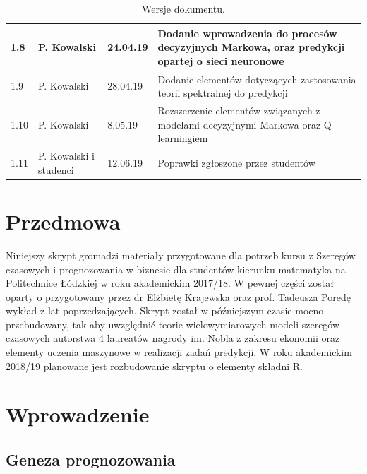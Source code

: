 \documentclass[10pt,a4paper]{book}
\begin{document}
\begin{table}[h]
\begin{tabular}{|p{1cm}|p{2cm}|p{12mm}|p{12cm}|}
1.8 & P. Kowalski & 24.04.19 & Dodanie wprowadzenia do procesów decyzyjnych Markowa, oraz predykcji opartej o sieci neuronowe \\\hline
1.9 & P. Kowalski & 28.04.19 & Dodanie elementów dotyczących zastosowania teorii spektralnej do predykcji \\\hline
1.10 & P. Kowalski & 8.05.19 & Rozszerzenie elementów związanych z modelami decyzyjnymi Markowa oraz Q-learningiem \\\hline
1.11 & P. Kowalski i studenci & 12.06.19 & Poprawki zgłoszone przez studentów \\\hline
\end{tabular}
\caption{Wersje dokumentu.}
\end{table}
\FloatBarrier

\chapter*{Przedmowa}

Niniejszy skrypt gromadzi materiały przygotowane dla potrzeb kursu z Szeregów czasowych i prognozowania w biznesie dla studentów kierunku matematyka na Politechnice Łódzkiej w roku akademickim 2017/18. W pewnej części został oparty o przygotowany przez dr Elżbietę Krajewska oraz prof. Tadeusza Poredę wykład z lat poprzedzających. Skrypt został w późniejszym czasie mocno przebudowany, tak aby uwzględnić teorie wielowymiarowych modeli szeregów czasowych autorstwa 4 laureatów nagrody im. Nobla z zakresu ekonomii oraz elementy uczenia maszynowe w realizacji zadań predykcji. W roku akademickim 2018/19 planowane jest rozbudowanie skryptu o elementy składni R. 

\newpage
\tableofcontents

\chapter{Wprowadzenie}

\section{Geneza prognozowania}
\end{document}

